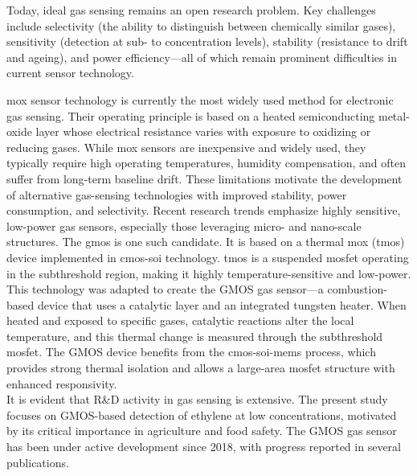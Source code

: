Today, ideal gas sensing remains an open research problem. Key challenges
include selectivity (the ability to distinguish between chemically similar
gases), sensitivity (detection at sub- to  concentration
levels), stability (resistance to drift and ageing), and power efficiency---all
of which remain prominent difficulties in current sensor technology.

\gls{mox} sensor technology is currently the most widely used method for electronic
gas sensing. Their operating principle is based on a heated semiconducting
metal-oxide layer whose electrical resistance varies with exposure to oxidizing
or reducing gases. While \gls{mox} sensors are inexpensive and widely used, they
typically require high operating temperatures, humidity compensation, and often
suffer from long-term baseline drift. These limitations motivate the
development of alternative gas-sensing technologies with improved stability,
power consumption, and selectivity. Recent research trends emphasize highly
sensitive, low-power gas sensors, especially those leveraging micro- and
nano-scale structures. The \gls{gmos} is one such candidate. It is based on a
thermal \gls{mox} (\gls{tmos}) device implemented in \gls{cmos}-\gls{soi}
technology. \gls{tmos} is a suspended \gls{mosfet} operating in the
subthreshold region, making it highly temperature-sensitive and
low-power. This technology was adapted to create the GMOS gas sensor—a
combustion-based device that uses a catalytic layer and an integrated tungsten
heater. When heated and exposed to specific gases, catalytic reactions alter
the local temperature, and this thermal change is measured through the
subthreshold \gls{mosfet}. The GMOS device benefits from the
\gls{cmos}-\gls{soi}-\gls{mems} process, which provides strong thermal
isolation and allows a large-area \gls{mosfet} structure with enhanced
responsivity. \\
It is evident that R\&D activity in gas sensing is extensive. The present study
focuses on GMOS-based detection of ethylene at low concentrations, motivated by
its critical importance in agriculture and food safety.
The GMOS gas sensor has been under active development since 2018, with progress
reported in several publications.

